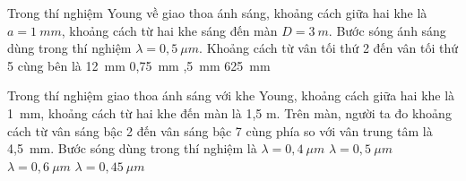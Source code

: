 \begin{ex}%
Trong thí nghiệm Young về giao thoa ánh sáng, khoảng cách giữa hai khe là $a=1\ mm$, khoảng cách từ hai khe sáng đến màn $D=3\ m$. Bước sóng ánh sáng dùng trong thí nghiệm $\lambda =0,5\ \mu m$. Khoảng cách từ vân tối thứ 2 đến vân tối thứ 5 cùng bên là
\choice
{12\ mm}
{0,75\ mm}
{,5\ mm}
{625\ mm}
\end{ex} 

\begin{ex}%
Trong thí nghiệm giao thoa ánh sáng với khe Young, khoảng cách giữa hai khe là 1\ mm, khoảng cách từ hai khe đến màn là 1,5 m. Trên màn, người ta đo khoảng cách từ vân sáng bậc 2 đến vân sáng bậc 7 cùng phía so với vân trung tâm là 4,5\ mm. Bước sóng dùng trong thí nghiệm là
\choice
{$\lambda = 0,4\ \mu m$}
{$\lambda = 0,5\ \mu m$}
{\True $\lambda = 0,6\ \mu m$}
{$\lambda = 0,45\ \mu m$}
\end{ex} 

